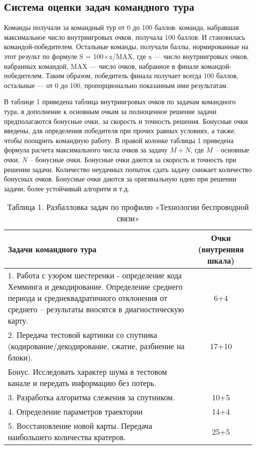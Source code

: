 \subsection*{Система оценки задач командного тура}

Команды получали за командный тур от 0 до 100 баллов: команда, набравшая максимальное число внутриигровых очков, получала 100 баллов. И становилась командой-победителем. Остальные команды, получали баллы, нормированные на этот результ по формуле S = 100×x/MAX, где x — число внутриигровых очков, набранных командой, MAX — число очков, набранное в финале командой-победителем. Таким образом, победитель финала получает всегда 100 баллов, остальные — от 0 до 100, пропорционально показанным ими результатам.

В таблице 1 приведена таблица внутриигровых очков по задачам командного тура, в дополнение к основным очкам за полноценное решение задачи предполагаются бонусные очки, за скорость и точность решения. Бонусные очки введены, для определения победителя при прочих равных условиях, а также, чтобы поощрить командную работу. В правой колонке таблицы 1 приведена формула расчета максимального числа очков за задачу $M+N$, где $M$ – основные очки, $N$ – бонусные очки. Бонусные очки даются за скорость и точность при решении задачи. Количество неудачных попыток сдать задачу снижает количество бонусных очков. Бонусные очки даются за оригинальную идею при решении задачи, более устойчивый алгоритм и т.д.

\begin{table}[H]
    \center
    \caption{Таблица 1. Разбалловка задач по профилю «Технологии беспроводной связи»}
    \begin{tabular}{|p{10cm}|c|}
        \hline
        Задачи командного тура & Очки (внутренняя шкала) \\
        \hline
        1. Работа с узором шестеренки - определение кода Хемминга и декодирование. Определение среднего периода и среднеквадратичного отклонения от среднего – результаты вносятся в диагностическую карту.	& 6+4 \\
        \hline
        2. Передача тестовой картинки со спутника (кодирование/декодирование, сжатие, разбиение на блоки). & 17+10 \\
        Бонус. Исследовать характер шума в тестовом канале и передать информацию без потерь. & \\
        \hline
        3. Разработка алгоритма слежения за спутником.	&10+5 \\
        \hline
        4. Определение параметров траектории&14+4\\
        \hline
        5. Восстановление новой карты. Передача наибольшего количества кратеров.	&25+5\\
        \hline
    \end{tabular}
\end{table}

